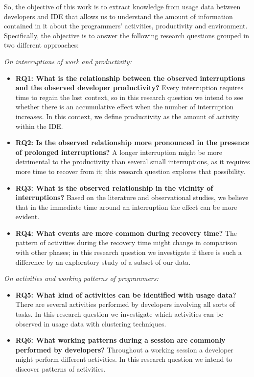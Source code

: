 So, the objective of this work is to extract knowledge from usage data between developers and IDE that allows us to understand the amount of information contained in it about the programmers' activities, productivity and environment. Specifically, the objective is to answer the following research questions grouped in two different approaches: 

\begin{changedforreviewerlong}

\emph{On interruptions of work and productivity:}
\begin{itemize}
	\item \textbf{RQ1: What is the relationship between the observed interruptions and the observed developer productivity?} Every interruption requires time to regain the lost context, so in this research question we intend to see whether there is an accumulative effect when the number of interruption increases. In this context, we define productivity as the amount of activity within the IDE. 
	\item \textbf{RQ2: Is the observed relationship more pronounced in the presence of prolonged interruptions?} A longer interruption might be more detrimental to the productivity than several small interruptions, as it requires more time to recover from it; this research question explores that possibility.
	\item \textbf{RQ3: What is the observed relationship in the vicinity of interruptions?} Based on the literature and observational studies, we believe that in the immediate time around an interruption the effect can be more evident.
	\item \textbf{RQ4: What events are more common during recovery time?} The pattern of activities during the recovery time might change in comparison with other phases; in this research question we investigate if there is such a difference by an exploratory study of a subset of our data. 
\end{itemize}

\emph{On activities and working patterns of programmers:}
\begin{itemize}
	\item \textbf{RQ5: What kind of activities can be identified with usage data?} There are several activities performed by developers involving all sorts of tasks. In this research question we investigate which activities can be observed in usage data with clustering techniques.
	\item \textbf{RQ6: What working patterns during a session are commonly performed by developers?} Throughout a	 working session a developer might perform different activities. In this research question we intend to discover patterns of activities.
\end{itemize}
\end{changedforreviewerlong}

